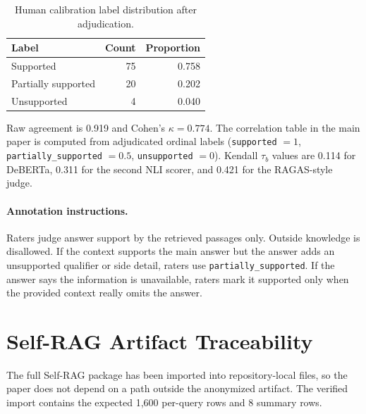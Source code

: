 \begin{table}[H]
\centering
\small
\caption{Human calibration label distribution after adjudication.}
\label{tab:human_label_distribution}
\begin{tabular}{lrr}
\toprule
Label & Count & Proportion \\
\midrule
Supported & 75 & 0.758 \\
Partially supported & 20 & 0.202 \\
Unsupported & 4 & 0.040 \\
\bottomrule
\end{tabular}
\end{table}

Raw agreement is 0.919 and Cohen's \(\kappa=0.774\). The correlation table in
the main paper is computed from adjudicated ordinal labels
(\verb|supported| \(=1\), \verb|partially_supported| \(=0.5\),
\verb|unsupported| \(=0\)). Kendall \(\tau_b\) values are 0.114 for DeBERTa,
0.311 for the second NLI scorer, and 0.421 for the RAGAS-style judge.

\paragraph{Annotation instructions.}
Raters judge answer support by the retrieved passages only. Outside knowledge
is disallowed. If the context supports the main answer but the answer adds an
unsupported qualifier or side detail, raters use \verb|partially_supported|.
If the answer says the information is unavailable, raters mark it supported
only when the provided context really omits the answer.

\section{Self-RAG Artifact Traceability}
\label{app:selfrag}

The full Self-RAG package has been imported into repository-local files, so the
paper does not depend on a path outside the anonymized artifact. The verified
import contains the expected 1,600 per-query rows and 8 summary rows.

